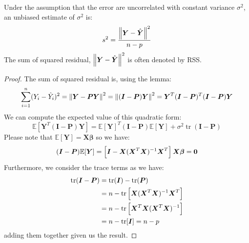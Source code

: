 \begin{theorem}
    Under the assumption that the error are uncorrelated with constant variance $\sigma^2$, an unbiased estimate of $\sigma^2$ is:
    \begin{equation*}
        s^2 = \frac{\left\lVert\boldsymbol Y - \hat{\boldsymbol Y}\right\rVert^2}{n-p}
    \end{equation*}
    The sum of squared residual, $\left\lVert\boldsymbol Y - \hat{\boldsymbol Y}\right\rVert^2$ is often denoted by RSS. 
\end{theorem}
\begin{proof}
    The sum of squared residual is, using the lemma:
    \begin{equation*}
    \begin{aligned}
        \sum^n_{i=1}(Y_i - \hat{Y}_i)^2 = \left\lVert\boldsymbol Y - \boldsymbol P\boldsymbol Y\right\rVert^2 = \left\lVert(\boldsymbol I - \boldsymbol P)\boldsymbol Y\right\rVert^2 = \boldsymbol Y^T(\boldsymbol I-\boldsymbol P)^T(\boldsymbol I-\boldsymbol P)\boldsymbol Y
    \end{aligned}
    \end{equation*}
    We can compute the expected value of this quadratic form:
    \begin{equation*}
        \mathbb{E}[\boldsymbol Y^T(\boldsymbol I-\boldsymbol P)\boldsymbol Y] = \mathbb{E}[\boldsymbol Y]^T(\boldsymbol I-\boldsymbol P)\mathbb{E}[\boldsymbol Y] + \sigma^2\operatorname{tr}(\boldsymbol I - \boldsymbol P)
    \end{equation*}
    Please note that $\mathbb{E}[\boldsymbol Y] = \boldsymbol X\boldsymbol \beta$ so we have:
    \begin{equation*}
        (\boldsymbol I - \boldsymbol P)\mathbb{E}[\boldsymbol Y] = \left[ \boldsymbol I - \boldsymbol X(\boldsymbol X^T\boldsymbol X)^{-1}\boldsymbol X^T \right]\boldsymbol X\boldsymbol \beta = \boldsymbol 0
    \end{equation*}
    Furthermore, we consider the trace terms as we have:
    \begin{equation*}
    \begin{aligned}
        \operatorname{tr}(\boldsymbol I - \boldsymbol P) &= \operatorname{tr}(\boldsymbol I) - \operatorname{tr}(\boldsymbol P) \\
        &= n - \operatorname{tr}\left[ \boldsymbol X(\boldsymbol X^T\boldsymbol X)^{-1}\boldsymbol X^T \right] \\
        &= n - \operatorname{tr}\left[ \boldsymbol X^T\boldsymbol X(\boldsymbol X^T\boldsymbol X)^{-1} \right] \\
        &= n - \operatorname{tr}[\boldsymbol I] = n-p
    \end{aligned}
    \end{equation*}
    adding them together given us the result.
\end{proof}

